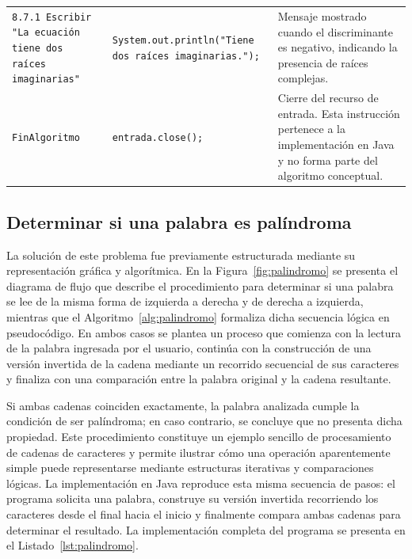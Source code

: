 \documentclass[12pt,twoside]{book}
\begin{document}
\begin{landscape}
\begin{longtable}{p{6cm} p{6cm} p{7.5cm}}
							
							\texttt{8.7.1 Escribir "La ecuación tiene dos raíces imaginarias"}
							&
							\texttt{System.out.println("Tiene dos raíces imaginarias.");}
							&
							Mensaje mostrado cuando el discriminante es negativo, indicando la presencia de raíces complejas. \\
							
							
							\texttt{FinAlgoritmo}
							&
							\texttt{entrada.close();}
							&
							Cierre del recurso de entrada. Esta instrucción pertenece a la implementación en Java y no forma parte del algoritmo conceptual. \\
							
						\end{longtable}
						
					\end{landscape}
					
				\subsection{Determinar si una palabra es palíndroma}
					\noindent
					La solución de este problema fue previamente estructurada mediante su representación gráfica y algorítmica. En la Figura~\ref{fig:palindromo} se presenta el diagrama de flujo que describe el procedimiento para determinar si una palabra se lee de la misma forma de izquierda a derecha y de derecha a izquierda, mientras que el Algoritmo~\ref{alg:palindromo} formaliza dicha secuencia lógica en pseudocódigo. En ambos casos se plantea un proceso que comienza con la lectura de la palabra ingresada por el usuario, continúa con la construcción de una versión invertida de la cadena mediante un recorrido secuencial de sus caracteres y finaliza con una comparación entre la palabra original y la cadena resultante.
					
					Si ambas cadenas coinciden exactamente, la palabra analizada cumple la condición de ser palíndroma; en caso contrario, se concluye que no presenta dicha propiedad. Este procedimiento constituye un ejemplo sencillo de procesamiento de cadenas de caracteres y permite ilustrar cómo una operación aparentemente simple puede representarse mediante estructuras iterativas y comparaciones lógicas. La implementación en Java reproduce esta misma secuencia de pasos: el programa solicita una palabra, construye su versión invertida recorriendo los caracteres desde el final hacia el inicio y finalmente compara ambas cadenas para determinar el resultado. La implementación completa del programa se presenta en el Listado~\ref{lst:palindromo}.
					
\end{document}
